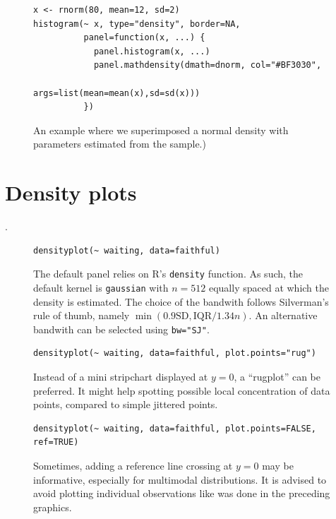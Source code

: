 \documentclass[a4paper,twoside]{book}
\newcounter{fig}
\newcommand{\img}[1]{\texttt{[image: \#1]}\stepcounter{fig}}
\renewcommand{\texttt}[1]{\lstinline{#1}}
\newcommand{\R}{\textsf{R}\xspace}
\begin{document}
\begin{figure}[H]
\begin{lstlisting}
x <- rnorm(80, mean=12, sd=2)
histogram(~ x, type="density", border=NA,
          panel=function(x, ...) {
            panel.histogram(x, ...)
            panel.mathdensity(dmath=dnorm, col="#BF3030",
                              args=list(mean=mean(x),sd=sd(x)))
          })
\end{lstlisting}
  \fcapside[\FBwidth] {\img{figs_lattice-crop}}
  {\caption*{An example where we superimposed a normal density with
      parameters estimated from the sample.)}}
\end{figure}

\section{Density plots}
\lipsum[1]\autocite{silverman86}.

\begin{figure}[H]
\begin{lstlisting}
densityplot(~ waiting, data=faithful)
\end{lstlisting}
  \fcapside[\FBwidth] {\img{figs_lattice-crop}} {\caption*{The default
      panel relies on \R's \texttt{density} function. As such, the
      default kernel is \texttt{gaussian} with $n=512$ equally spaced
      at which the density is estimated. The choice of the bandwith
      follows Silverman's rule of thumb, namely
      $\min(0.9\textrm{SD},\textrm{IQR}/1.34n)$. An alternative
      bandwith can be selected using \texttt{bw="SJ"}.}}
\end{figure}

\begin{figure}[H]
\begin{lstlisting}
densityplot(~ waiting, data=faithful, plot.points="rug")
\end{lstlisting}
  \fcapside[\FBwidth] {\img{figs_lattice-crop}} {\caption*{Instead of
      a mini stripchart displayed at $y=0$, a ``rugplot'' can be
      preferred. It might help spotting possible local concentration
      of data points, compared to simple jittered points.}}
\end{figure}

\begin{figure}[H]
\begin{lstlisting}
densityplot(~ waiting, data=faithful, plot.points=FALSE, ref=TRUE)
\end{lstlisting}
  \fcapside[\FBwidth] {\img{figs_lattice-crop}} {\caption*{Sometimes,
      adding a reference line crossing at $y=0$ may be informative,
      especially for multimodal distributions. It is advised to avoid
      plotting individual observations like was done in the preceding
      graphics.}}
\end{figure}
\end{document}
